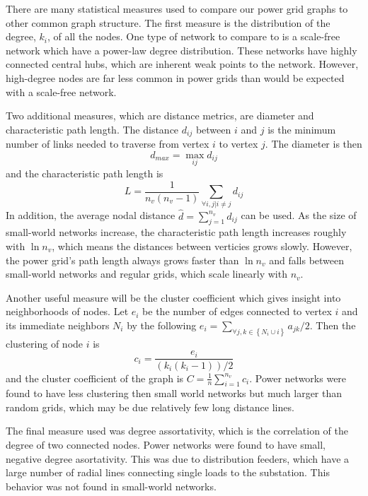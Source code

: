 There are many statistical measures used to compare our power grid graphs to other common graph structure.  The first measure is the distribution of the degree, $k_i$, of all the nodes.  One type of network to compare to is a scale-free network which have a power-law degree distribution.  These networks have highly connected central hubs, which are inherent weak points to the network.  However, high-degree nodes are far less common in power grids than would be expected with a scale-free network.    

Two additional measures, which are distance metrics, are diameter and characteristic path length.  The distance $d_{ij}$ between $i$ and $j$ is the minimum number of links needed to traverse from vertex $i$ to vertex $j$.  The diameter is then 
\begin{equation}
d_{max} = \max_{ij} d_{ij}
\end{equation}
 and the characteristic path length is 
\begin{equation}
L = \frac{1}{n_v (n_v -1)} \sum_{\forall i,j | i \neq j} d_{ij}
\end{equation}
In addition, the average nodal distance $\hat{d} = \sum_{j=1}^{n_v} d_{ij}$ can be used.  As the size of small-world networks increase, the characteristic path length increases roughly with $\ln n_v$, which means the distances between verticies grows slowly.  However, the power grid's path length always grows faster than $\ln n_v$ and falls between small-world networks and regular grids, which scale linearly with $n_v$.

Another useful measure will be the cluster coefficient which gives insight into neighborhoods of nodes.  Let $e_i$ be the number of edges connected to vertex $i$ and its immediate neighbors $N_i$ by the following $e_i =\sum_{\forall j,k \in \left\{ N_i \cup i \right\}} a_{jk}/2$.  Then the clustering of node $i$ is
\begin{equation}
c_i = \frac{e_i}{(k_i(k_i-1))/2}
\end{equation}
and the cluster coefficient of the graph is $C = \frac{1}{n} \sum_{i=1}^{n_v} c_i$.  Power networks were found to have less clustering then small world networks but much larger than random grids, which may be due relatively few long distance lines.

The final measure used was degree assortativity, which is the correlation of the degree of two connected nodes.  Power networks were found to have small, negative degree asortativity.  This was due to distribution feeders, which have a large number of radial lines connecting single loads to the substation.  This behavior was not found in small-world networks.


